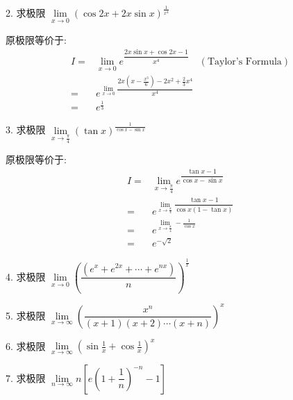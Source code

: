 2. 求极限 $\lim\limits_{x\to 0}(\cos 2x+2x\sin x)^{\frac{1}{x^{4}}}$
\begin{solution}

	原极限等价于:
	\begin{align*}
		I = & \lim\limits_{x\to 0}e^{\dfrac{2x\sin x+\cos 2x-1}{x^{4}}}\quad (\text{Taylor's Formula})\\
		  = & e^{\lim\limits_{x\to 0}\dfrac{2x(x-\frac{x^{3}}{6})-2x^{2}+\frac{2}{3}x^{4}}{x^{4}}}\\
		  = & e^{\frac{1}{3}}
	\end{align*}
\end{solution}

3. 求极限 $\lim\limits_{x\to \frac{\pi}{4}}\left( \tan x\right) ^{\frac{1}{\cos x-\sin x}}$
\begin{solution}

	原极限等价于:
	\begin{align*}
		I = & \lim\limits_{x\to \frac{\pi}{4}}e^{\dfrac{\tan x-1}{\cos x-\sin x}}\\
		  = & e^{\lim\limits_{x\to \frac{\pi}{4}}\dfrac{\tan x-1}{\cos x(1-\tan x)}}\\
		  = & e^{\lim\limits_{x\to \frac{\pi}{4}}-\frac{1}{\cos x}}\\
		  = & e^{-\sqrt{2}}
	\end{align*}
\end{solution}

4. 求极限 $\lim\limits_{x\to 0}\left(\dfrac{(e^{x}+e^{2x}+\cdots +e^{nx})}{n} \right)^{\frac{1}{x}} $
\begin{solution}
	
\end{solution}

5. 求极限 $\lim\limits_{x\to \infty}\left(\dfrac{x^{n}}{(x+1)(x+2)\cdots(x+n)} \right)^{x} $
\begin{solution}
	
\end{solution}

6. 求极限 $\lim\limits_{x\to \infty}\left(\sin\frac{1}{x}+\cos\frac{1}{x} \right)^{x} $
\begin{solution}
	
\end{solution}

7. 求极限 $\lim\limits_{n\to \infty}n\left[e\left(1+\dfrac{1}{n} \right)^{-n}-1 \right]$
\begin{solution}
	
\end{solution}

